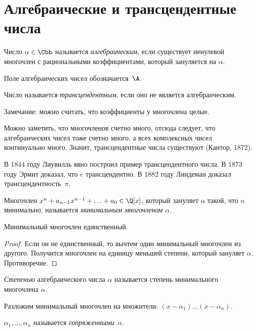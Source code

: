 \section{Алгебраические и трансцендентные числа}

\begin{df}
  Число $\alpha \in \Cbb$ называется \emph{алгебраическим}, если
  существует ненулевой многочлен с рациональными коэффициентами,
  который зануляется на $\alpha$.
\end{df}
\begin{denote}
  Поле алгебраических чисел обозначается~$\A$.
\end{denote}
\begin{df}
  Число называется \emph{трансцендентным}, если оно не является
  алгебраическим.
\end{df}

Замечание: можно считать, что коэффициенты у многочлена целые.

Можно заметить, что многочленов счетно много, отсюда следует, что
алгебраических чисел тоже счетно много, а всех комплексных чисел
континуально много. Значит, трансцендентные числа существуют (Кантор,
1872).

В 1844 году Лиувилль явно построил пример трансцендентного числа. В
1873 году Эрмит доказал, что $e$ трансцендентно. В 1882 году Линдеман
доказал трансцендентность~$\pi$.

\begin{df}
  Многочлен $x^n + a_{n-1}x^{n-1} + \ldots + a_0 \in \Q[x]$, который
  зануляет $\alpha$ такой, что $n$ минимально, называется
  \emph{минимальным многочленом $\alpha$}.
\end{df}

\begin{stm}
  Минимальный многочлен единственный.
\end{stm}
\begin{proof}
  Если он не единственный, то вычтем один минимальный многочлен из
  другого. Получится многочлен на единицу меньшей степени, который
  зануляет $\alpha$. Противоречие.
\end{proof}

\begin{df}
  \emph{Степенью} алгебраического числа $\alpha$ называется степень
  минимального многочлена $\alpha$.
\end{df}

Разложим минимальный многочлен на множители: $(x - \alpha_1) \ldots (x
- \alpha_n)$.

\begin{df}
  $\alpha_1, \ldots, \alpha_n$ называется
  \emph{сопряженными}~$\alpha$.
\end{df}

